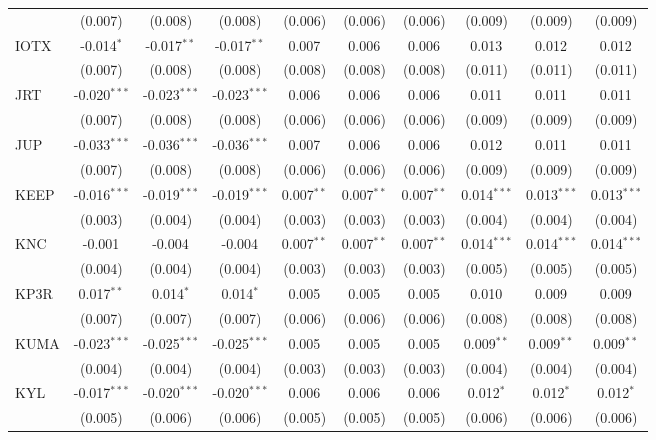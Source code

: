 \begin{table}[!htbp]
\begin{tabular}{@{\extracolsep{5pt}}lccccccccc}
  & (0.007) & (0.008) & (0.008) & (0.006) & (0.006) & (0.006) & (0.009) & (0.009) & (0.009) \\
 IOTX & -0.014$^{*}$ & -0.017$^{**}$ & -0.017$^{**}$ & 0.007$^{}$ & 0.006$^{}$ & 0.006$^{}$ & 0.013$^{}$ & 0.012$^{}$ & 0.012$^{}$ \\
  & (0.007) & (0.008) & (0.008) & (0.008) & (0.008) & (0.008) & (0.011) & (0.011) & (0.011) \\
 JRT & -0.020$^{***}$ & -0.023$^{***}$ & -0.023$^{***}$ & 0.006$^{}$ & 0.006$^{}$ & 0.006$^{}$ & 0.011$^{}$ & 0.011$^{}$ & 0.011$^{}$ \\
  & (0.007) & (0.008) & (0.008) & (0.006) & (0.006) & (0.006) & (0.009) & (0.009) & (0.009) \\
 JUP & -0.033$^{***}$ & -0.036$^{***}$ & -0.036$^{***}$ & 0.007$^{}$ & 0.006$^{}$ & 0.006$^{}$ & 0.012$^{}$ & 0.011$^{}$ & 0.011$^{}$ \\
  & (0.007) & (0.008) & (0.008) & (0.006) & (0.006) & (0.006) & (0.009) & (0.009) & (0.009) \\
 KEEP & -0.016$^{***}$ & -0.019$^{***}$ & -0.019$^{***}$ & 0.007$^{**}$ & 0.007$^{**}$ & 0.007$^{**}$ & 0.014$^{***}$ & 0.013$^{***}$ & 0.013$^{***}$ \\
  & (0.003) & (0.004) & (0.004) & (0.003) & (0.003) & (0.003) & (0.004) & (0.004) & (0.004) \\
 KNC & -0.001$^{}$ & -0.004$^{}$ & -0.004$^{}$ & 0.007$^{**}$ & 0.007$^{**}$ & 0.007$^{**}$ & 0.014$^{***}$ & 0.014$^{***}$ & 0.014$^{***}$ \\
  & (0.004) & (0.004) & (0.004) & (0.003) & (0.003) & (0.003) & (0.005) & (0.005) & (0.005) \\
 KP3R & 0.017$^{**}$ & 0.014$^{*}$ & 0.014$^{*}$ & 0.005$^{}$ & 0.005$^{}$ & 0.005$^{}$ & 0.010$^{}$ & 0.009$^{}$ & 0.009$^{}$ \\
  & (0.007) & (0.007) & (0.007) & (0.006) & (0.006) & (0.006) & (0.008) & (0.008) & (0.008) \\
 KUMA & -0.023$^{***}$ & -0.025$^{***}$ & -0.025$^{***}$ & 0.005$^{}$ & 0.005$^{}$ & 0.005$^{}$ & 0.009$^{**}$ & 0.009$^{**}$ & 0.009$^{**}$ \\
  & (0.004) & (0.004) & (0.004) & (0.003) & (0.003) & (0.003) & (0.004) & (0.004) & (0.004) \\
 KYL & -0.017$^{***}$ & -0.020$^{***}$ & -0.020$^{***}$ & 0.006$^{}$ & 0.006$^{}$ & 0.006$^{}$ & 0.012$^{*}$ & 0.012$^{*}$ & 0.012$^{*}$ \\
  & (0.005) & (0.006) & (0.006) & (0.005) & (0.005) & (0.005) & (0.006) & (0.006) & (0.006) \\

\end{tabular}
\end{table}
